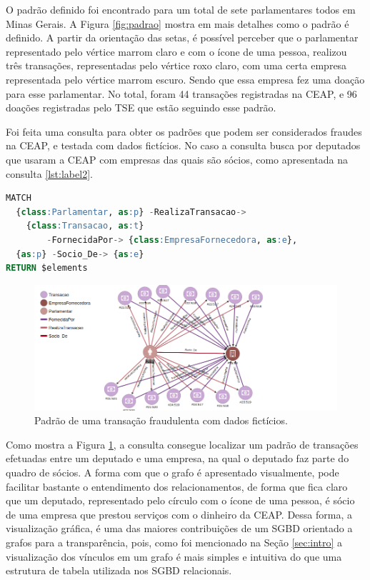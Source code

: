 \documentclass[12pt]{article}
\begin{document}
O padrão definido foi encontrado para um total de sete parlamentares todos em Minas Gerais. A Figura \ref{fig:padrao} mostra em mais detalhes como o padrão é definido. A partir da orientação das setas, é possível perceber que o parlamentar representado pelo vértice marrom claro e com o ícone de uma pessoa, realizou três transações, representadas pelo vértice roxo claro, com uma certa empresa representada pelo vértice marrom escuro. Sendo que essa empresa fez uma doação para esse parlamentar. No total, foram 44 transações registradas na CEAP, e 96 doações registradas pelo TSE que estão seguindo esse padrão.

Foi feita uma consulta para obter os padrões que podem ser considerados fraudes na CEAP, e testada com dados fictícios. No caso a consulta busca por deputados que usaram a CEAP com empresas das quais são sócios, como apresentada na consulta \ref{lst:label2}.

\begin{lstlisting}[label={lst:label2}, caption={Consulta de relacionamento de uso da CEAP entre deputados e empresas nas quais o deputado é sócio.},captionpos=b, language=sql]
MATCH 
  {class:Parlamentar, as:p} -RealizaTransacao-> 
  	{class:Transacao, as:t} 
    	-FornecidaPor-> {class:EmpresaFornecedora, as:e},
  {as:p} -Socio_De-> {as:e}
RETURN $elements
\end{lstlisting}

\begin{figure}[ht]
\centering
\includegraphics[width=.85\textwidth]{socios.png}
\caption{Padrão de uma transação fraudulenta com dados fictícios.}
\label{fig:socios}
\end{figure}

Como mostra a Figura \ref{fig:socios}, a consulta consegue localizar um padrão de transações efetuadas entre um deputado e uma empresa, na qual o deputado faz parte do quadro de sócios. A forma com que o grafo é apresentado visualmente, pode facilitar bastante o entendimento dos relacionamentos, de forma que fica claro que um deputado, representado pelo círculo com o ícone de uma pessoa, é sócio de uma empresa que prestou serviços com o dinheiro da CEAP. Dessa forma, a visualização gráfica, é uma das maiores contribuições de um SGBD orientado a grafos para a transparência, pois, como foi mencionado na Seção \ref{sec:intro} a visualização dos vínculos em um grafo é mais simples e intuitiva do que uma estrutura de tabela utilizada nos SGBD relacionais.
\end{document}
